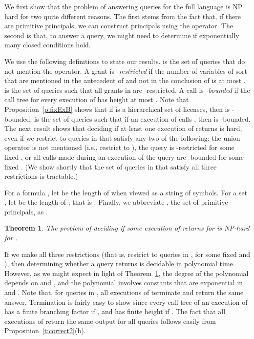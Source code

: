 \documentclass{acmtrans2m}
\newtheorem{theorem}{Theorem}[section]
\newcommand{\thm}{\begin{theorem}}
\newcommand{\ethm}{\end{theorem}}
\newcommand{\<}{
}
\renewcommand{\>}{\rangle}
\begin{document}
We first show that the problem of answering queries for the full language  is NP hard for two
quite different reasons.  The first stems from the fact that, if there are  primitive principals, we
can construct  principals using the  operator.  The second is that, to answer a query, we
might need to determine if exponentially many closed  conditions hold.

We use the following definitions to state our results.   is the set of queries that do not
mention the  operator.  A grant  is \emph{-restricted} if the number of variables of sort
 that are mentioned in the antecedent of  and not in the conclusion of  is at most .
 is the set of queries  such that all grants in  are
-restricted.  A call  is \emph{-bounded} if the call tree for every execution
of  has height at most .  Note that Proposition~\ref{p:fixExB} shows that
if  is a hierarchical set of licenses, then  is -bounded.
 is the set of queries  such that if an execution of
 calls , then  is -bounded.
The next result shows that deciding if at least one execution of  returns  is hard, even
if we restrict to queries in  that satisfy any two of the following: the union operator is not
mentioned (i.e., restrict to ), the query is -restricted for some fixed , or all calls made
during an execution of the query are -bounded for some fixed .  (We show shortly that the set of
queries in  that satisfy all three restrictions is tractable.)

For a formula , let  be the length of  when viewed as a string of symbols.  For a
set , let  be the length of ; that is .  Finally, we
abbreviate , the set of primitive principals, as .

\thm\label{t:NPHardAll}
The problem of deciding
if some
execution of  returns  for 
is  NP-hard for .
\ethm

If we make all three restrictions (that is, restrict to queries in
, for some fixed  and ), then determining whether
a query returns  is decidable in polynomial time.  However, as we might expect in light of
Theorem~\ref{t:NPHardAll}, the degree of the polynomial depends on  and , and the polynomial involves
constants that are exponential in  and .  Note that, for queries in
, all executions of  terminate and return the
same answer.  Termination is fairly easy to show since every call tree of an execution of
 has a finite branching factor if , and has finite
height if .  The fact that all executions of 
return the same output for all queries
 follows easily from
Proposition~\ref{t:correct2}(b).
\end{document}
